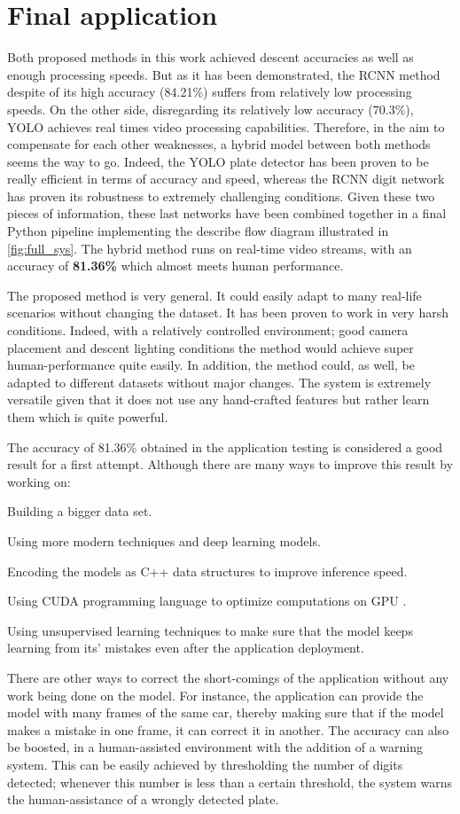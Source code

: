 \section{Final application}
Both proposed methods in this work achieved descent accuracies as well as enough processing speeds. But as it has been demonstrated, the RCNN method despite of its high accuracy (84.21\%) suffers from relatively low processing speeds. On the other side, disregarding its relatively low accuracy (70.3\%), YOLO achieves real times video processing capabilities. Therefore, in the aim to compensate for each other weaknesses, a hybrid model between both methods seems the way to go. Indeed, the YOLO plate detector has been proven to be really efficient in terms of accuracy and speed, whereas the RCNN digit network has proven its robustness to extremely challenging conditions. Given these two pieces of information, these last networks have been combined together in a final Python pipeline implementing the describe flow diagram illustrated in \cref{fig:full_sys}. The hybrid method runs on real-time video streams, with an accuracy of \textbf{81.36\%} which almost meets human performance.

The proposed method is very general. It could easily adapt to many real-life scenarios without changing the dataset. It has been proven to work in very harsh conditions. Indeed, with a relatively controlled environment; good camera placement and descent lighting conditions the method would achieve super human-performance quite easily. In addition, the method could, as well, be adapted to different datasets without major changes. The system is extremely versatile given that it does not use any hand-crafted features but rather learn them which is quite powerful.

The accuracy of 81.36\% obtained in the application testing is considered a good result for a first attempt. Although there are many ways to improve this result by working on:
\begin{compactitem}
	\item Building a bigger data set.
	\item Using more modern techniques and deep learning models.
	\item Encoding the models as C++ data structures to improve inference speed.
	\item Using CUDA programming language to optimize computations on GPU \cite{b21}.
	\item Using unsupervised learning techniques to make sure that the model keeps learning from its' mistakes even after the application deployment.
\end{compactitem}

There are other ways to correct the short-comings of the application without any work being done on the model. For instance, the application can provide the model with many frames of the same car, thereby making sure that if the model makes a mistake in one frame, it can correct it in another. The accuracy can also be boosted, in a human-assisted environment with the addition of a warning system. This can be easily achieved by thresholding the number of digits detected; whenever this number is less than a certain threshold, the system warns the human-assistance of a wrongly detected plate.
